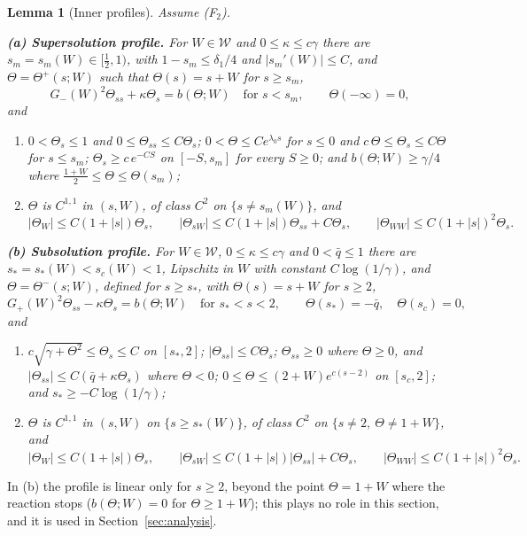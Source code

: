 \documentclass[11pt]{amsart}
\newtheorem{lemma}[theorem]{Lemma}
\theoremstyle{definition}
\theoremstyle{remark}
\begin{document}
\begin{lemma}[Inner profiles]\label{q:lem:inner}
Assume (F$_2$).

\textbf{(a) Supersolution profile.} For $W\in\mathcal W$ and $0\le\kappa\le c\gamma$
there are $s_m=s_m(W)\in[\frac12,1)$, with $1-s_m\le\delta_1/4$ and $|s_m'(W)|\le C$, and
$\Theta=\Theta^+(s;W)$ such that $\Theta(s)=s+W$ for $s\ge s_m$,
\[
G_-(W)^2\Theta_{ss}+\kappa\Theta_s=b(\Theta;W)\quad\text{for }s<s_m,\qquad\Theta(-\infty)=0,
\]
and
\begin{enumerate}
\item[(i)] $0<\Theta_s\le1$ and $0\le\Theta_{ss}\le C\Theta_s$; $0<\Theta\le Ce^{\lambda_0s}$ for
$s\le0$ and $c\,\Theta\le\Theta_s\le C\Theta$ for $s\le s_m$; $\Theta_s\ge c\,e^{-CS}$ on $[-S,s_m]$ for every $S\ge0$; and
$b(\Theta;W)\ge\gamma/4$ where $\frac{1+W}2\le\Theta\le\Theta(s_m)$;
\item[(ii)] $\Theta$ is $C^{1,1}$ in $(s,W)$, of class $C^2$ on $\{s\ne s_m(W)\}$, and
\[
|\Theta_W|\le C(1+|s|)\Theta_s,\qquad
|\Theta_{sW}|\le C(1+|s|)\Theta_{ss}+C\Theta_s,\qquad
|\Theta_{WW}|\le C(1+|s|)^2\Theta_s .
\]
\end{enumerate}
\textbf{(b) Subsolution profile.} For $W\in\mathcal W$, $0\le\kappa\le c\gamma$ and
$0<\bar q\le1$ there are $s_*=s_*(W)<s_c(W)<1$, Lipschitz in $W$ with constant
$C\log(1/\gamma)$, and
$\Theta=\Theta^-(s;W)$, defined for $s\ge s_*$, with $\Theta(s)=s+W$ for $s\ge2$,
\[
G_+(W)^2\Theta_{ss}-\kappa\Theta_s=b(\Theta;W)\quad\text{for }s_*<s<2,\qquad
\Theta(s_*)=-\bar q,\quad\Theta(s_c)=0,
\]
and
\begin{enumerate}
\item[(i)] $c\sqrt{\gamma+\Theta^2}\le\Theta_s\le C$ on $[s_*,2]$; $|\Theta_{ss}|\le C\Theta_s$;
$\Theta_{ss}\ge0$ where $\Theta\ge0$, and $|\Theta_{ss}|\le C(\bar q+\kappa\Theta_s)$ where $\Theta<0$;
$0\le\Theta\le(2+W)e^{c(s-2)}$ on $[s_c,2]$; and $s_*\ge-C\log(1/\gamma)$;
\item[(ii)] $\Theta$ is $C^{1,1}$ in $(s,W)$ on $\{s\ge s_*(W)\}$, of class $C^2$ on
$\{s\ne2,\ \Theta\ne1+W\}$, and
\[
|\Theta_W|\le C(1+|s|)\Theta_s,\qquad
|\Theta_{sW}|\le C(1+|s|)|\Theta_{ss}|+C\Theta_s,\qquad
|\Theta_{WW}|\le C(1+|s|)^2\Theta_s .
\]
\end{enumerate}
\end{lemma}

In (b) the profile is linear only for $s\ge2$, beyond the point $\Theta=1+W$ where the
reaction stops ($b(\Theta;W)=0$ for $\Theta\ge1+W$); this plays no role in this section, and
it is used in Section~\ref{sec:analysis}.
\end{document}
